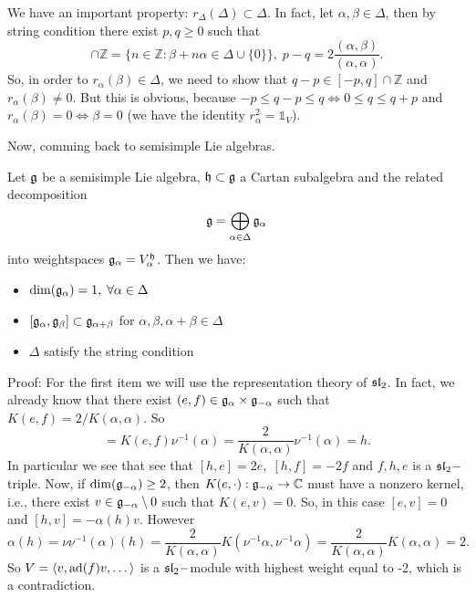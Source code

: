 We have an important property: $r_\Delta(\Delta)\subset \Delta$. In fact, let $\alpha,\beta \in\Delta$, then by 
string condition there exist $p,q\geq0$ such that
    \begin{equation}
                [-p,q]\cap\mathbb{Z}=\{n\in\mathbb{Z}: \beta+n\alpha\in\Delta\cup\{0\}\},
                \;p-q=2\frac{(\alpha,\beta)}{(\alpha,\alpha)}.
    \end{equation}
So, in order to $r_\alpha(\beta)\in\Delta$, we need to show that $q-p\in [-p,q]\cap\mathbb{Z}$ and $r_\alpha(\beta)\neq0$. 
But this is obvious, because 
$-p\leq q-p\leq q\iff 0\leq q\leq q+p$ and $r_\alpha(\beta)=0\iff \beta=0$ (we have the identity $r_\alpha^2=\mathds{1}_V$).\par

Now, comming back to semisimple Lie algebras. 

\begin{dang}
    \begin{lemma}
        Let $\mathfrak{g}$ be a semisimple Lie algebra, $\mathfrak{h}\subset \mathfrak{g}$ a Cartan subalgebra and the related decomposition
        \begin{equation}
            \mathfrak{g}=\bigoplus_{\alpha\in\Delta}\mathfrak{g}_\alpha
        \end{equation}
        into weightspaces $\mathfrak{g}_\alpha=V_\alpha^{\mathfrak{h}}$. Then we have:
        \begin{itemize}
            \item[1.] $\dim(\mathfrak{g}_\alpha)=1,\;\forall \alpha\in\Delta$
            \item[2.] $[\mathfrak{g}_\alpha,\mathfrak{g}_\beta]\subset\mathfrak{g}_{\alpha+\beta}$ for $\alpha,\beta,\alpha+\beta\in\Delta$
            \item[3.] $\Delta$ satisfy the string condition  
        \end{itemize}
    \end{lemma}
\end{dang}
Proof: For the first item we will use the representation theory of $\mathfrak{sl}_2$. In fact, we already know that there exist 
$(e,f)\in\mathfrak{g}_\alpha\times\mathfrak{g}_{-\alpha}$ such that $K(e,f)=2/K(\alpha,\alpha)$. So 
\begin{equation}
    [e,f]=K(e,f)\nu^{-1}(\alpha)=\frac{2}{K(\alpha,\alpha)}\nu^{-1}(\alpha)=h.
\end{equation}
In particular we see that see that $[h,e]=2e,\;[h,f]=-2f$ and ${f,h,e}$ is a $\mathfrak{sl}_2-$triple. Now, if 
$\dim(\mathfrak{g}_{-\alpha})\geq2$, then $K(e,\cdot):\mathfrak{g}_{-\alpha}\to\mathbb{C}$ must have a nonzero kernel, i.e., there exist 
$v\in\mathfrak{g}_{-\alpha}\setminus0$ such that $K(e,v)=0$. So, in this case $[e,v]=0$ and $[h,v]=-\alpha(h)v$. However
\begin{equation}
    \alpha(h)=\nu\nu^{-1}(\alpha)(h)
    =\frac{2}{K(\alpha,\alpha)}K(\nu^{-1}\alpha,\nu^{-1}\alpha)=\frac{2}{K(\alpha,\alpha)}K(\alpha,\alpha)=2.
\end{equation}
So $V=\langle v,\text{ad}(f)v,\dots\rangle$ is a $\mathfrak{sl}_2-$module with highest weight equal to -2, which is a contradiction.\par

